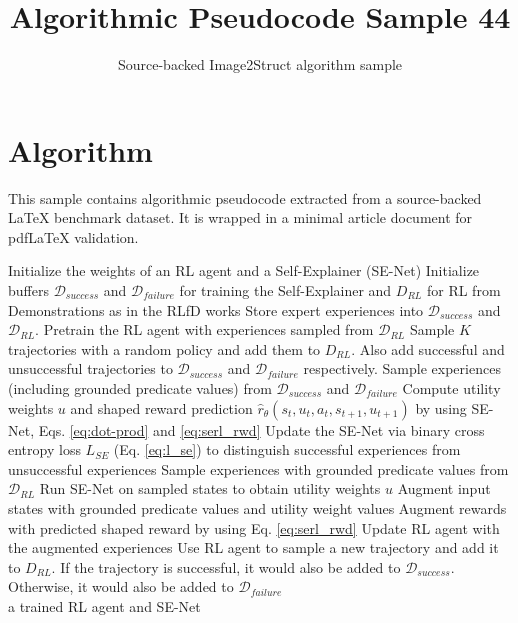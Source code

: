 \documentclass[11pt]{article}
\title{Algorithmic Pseudocode Sample 44}
\author{Source-backed Image2Struct algorithm sample}
\date{}
\begin{document}
\maketitle
\section{Algorithm}
This sample contains algorithmic pseudocode extracted from a source-backed LaTeX benchmark dataset. It is wrapped in a minimal article document for pdfLaTeX validation.

\begin{algorithm}[htbp]
\caption{Source-backed algorithmic procedure}
\begin{algorithmic}[1]
\State Initialize the weights of an RL agent and a Self-Explainer (SE-Net)
\State Initialize buffers $\mathcal{D}_{success}$ and $\mathcal{D}_{failure}$ for training the Self-Explainer and $D_{RL}$ for RL from Demonstrations as in the RLfD works \cite{hester2017deep,vecerik2017leveraging}
\State Store expert experiences into $\mathcal{D}_{success}$ and $\mathcal{D}_{RL}$. Pretrain the RL agent with experiences sampled from $\mathcal{D}_{RL}$
\State Sample $K$ trajectories with a random policy and add them to $D_{RL}$. Also add successful and unsuccessful trajectories to $\mathcal{D}_{success}$ and $\mathcal{D}_{failure}$ respectively.
\State Sample experiences (including grounded predicate values) from $\mathcal{D}_{success}$ and $\mathcal{D}_{failure}$ 
\State Compute utility weights $u$ and shaped reward prediction $\hat{r}_\theta(s_t,u_t,a_t,s_{t+1},u_{t+1})$ by using SE-Net, Eqs. \ref{eq:dot-prod} and \ref{eq:serl_rwd}
\State Update the SE-Net via binary cross entropy loss $L_{SE}$ (Eq. \ref{eq:l_se}) to distinguish successful experiences from unsuccessful experiences
\State Sample experiences with grounded predicate values from $\mathcal{D}_{RL}$ 
\State Run SE-Net on sampled states to obtain utility weights $u$
\State Augment input states with grounded predicate values and utility weight values
\State Augment rewards with predicted shaped reward by using Eq. \ref{eq:serl_rwd}
\State Update RL agent with the augmented experiences
\State Use RL agent to sample a new trajectory and add it to $D_{RL}$. If the trajectory is successful, it would also be added to $\mathcal{D}_{success}$. Otherwise, it would also be added to $\mathcal{D}_{failure}$ 
\EndFor \\
\Return a trained RL agent and SE-Net
\end{algorithmic}
\end{algorithm}
\end{document}
